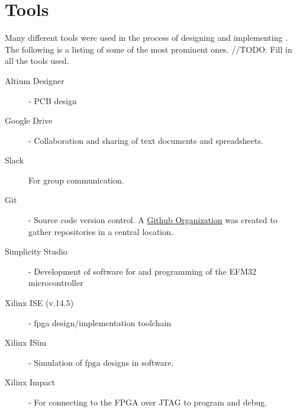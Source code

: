 \chapter{Tools}

Many different tools were used in the process of designing and implementing \vthreek.
The following is a listing of some of the most prominent ones.
//TODO: Fill in all the tools used.

\begin{description}
    \item[Altium Designer] - \gls{PCB} design
    \item[Google Drive] - Collaboration and sharing of text documents and spreadsheets.
    \item[Slack] For group communication.
    \item[Git] - Source code version control. A \href{https://github.com/DMPRO-2015-vector-graphics}{Github Organization} was created to gather repositories in a central location.
    \item[Simplicity Studio] - Development of software for and programming of the EFM32 microcontroller
    \item[Xilinx ISE (v.14.5)] - \gls{fpga} design/implementation toolchain
    \item[Xilinx ISim] - Simulation of \gls{fpga} designs in software.
    \item[Xilinx Impact] - For connecting to the FPGA over JTAG to program and debug.
\end{description}
